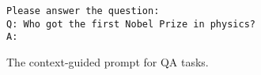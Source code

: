 \renewcommand{\fcolorbox}[4][]{#4} %
\begin{figure}[t]
    \begin{tcolorbox}[
    right=1pt, left=1pt, top=1pt, bottom=1pt,
    toptitle=1mm, bottomtitle=1mm,
    colback=white,
    coltitle=white,
    colbacktitle=matisse,
    colframe=matisse,
    title=,]%
    \begin{verbatim}
Please answer the question:
Q: Who got the first Nobel Prize in physics?
A:
    \end{verbatim}
    \end{tcolorbox}
    \caption{The context-guided prompt for QA tasks.}
    \label{fig:inst_prompt}
\end{figure}
